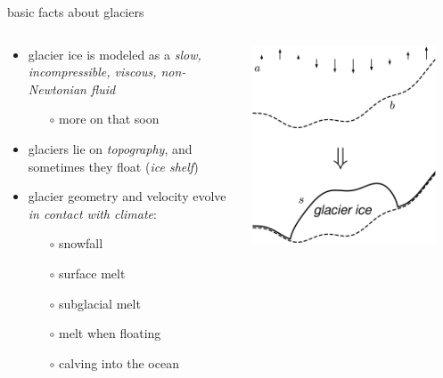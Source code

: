 \documentclass[svgnames,
               hyperref={colorlinks,citecolor=DeepPink4,linkcolor=FireBrick,urlcolor=Maroon},
               usepdftitle=false]  %
               {beamer}
\begin{document}
\begin{frame}{basic facts about glaciers}

\begin{columns}
\begin{column}{0.6\textwidth}
\begin{itemize}
\item glacier ice is modeled as a \emph{slow, incompressible, viscous, non-Newtonian fluid}
    \begin{itemize}
    \item[$\circ$] more on that soon
    \end{itemize}
\item glaciers lie on \emph{topography}, and sometimes they float  (\emph{ice shelf})
\item glacier geometry and velocity evolve \emph{in contact with climate}:
    \begin{itemize}
    \item[$\circ$] snowfall
    \item[$\circ$] surface melt
    \item[$\circ$] subglacial melt
    \item[$\circ$] melt when floating
    \item[$\circ$] calving into the ocean
    \end{itemize}
\end{itemize}
\end{column}
\begin{column}{0.42\textwidth}
\hfill \includegraphics[width=0.9\textwidth]{images/map-glacier-ice.png}
\end{column}
\end{columns}
\end{frame}
\end{document}
